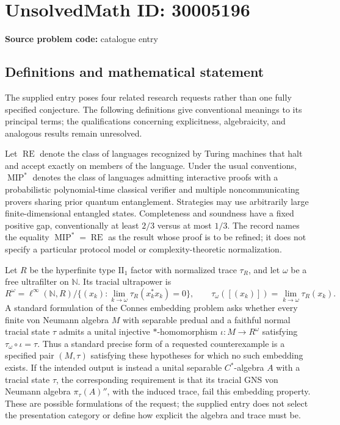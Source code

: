 \documentclass[11pt]{article}
\newcommand{\N}{\mathbb{N}}
\begin{document}
\section*{UnsolvedMath ID: 30005196}
\textbf{Source problem code:} catalogue entry
\subsection{Definitions and mathematical statement}
The supplied entry poses four related research requests rather than one fully specified conjecture. The following definitions give conventional meanings to its principal terms; the qualifications concerning explicitness, algebraicity, and analogous results remain unresolved.

Let \(\operatorname{RE}\) denote the class of languages recognized by Turing machines that halt and accept exactly on members of the language. Under the usual conventions, \(\operatorname{MIP}^{*}\) denotes the class of languages admitting interactive proofs with a probabilistic polynomial-time classical verifier and multiple noncommunicating provers sharing prior quantum entanglement. Strategies may use arbitrarily large finite-dimensional entangled states. Completeness and soundness have a fixed positive gap, conventionally at least \(2/3\) versus at most \(1/3\). The record names the equality \(\operatorname{MIP}^{*}=\operatorname{RE}\) as the result whose proof is to be refined; it does not specify a particular protocol model or complexity-theoretic normalization.

Let \(R\) be the hyperfinite type \(\mathrm{II}_1\) factor with normalized trace \(\tau_R\), and let \(\omega\) be a free ultrafilter on \(\N\). Its tracial ultrapower is
\[
 R^{\omega}=\ell^{\infty}(\N,R)\big/\{(x_k):\lim_{k\to\omega}\tau_R(x_k^*x_k)=0\},
 \qquad
 \tau_{\omega}([(x_k)])=\lim_{k\to\omega}\tau_R(x_k).
\]
A standard formulation of the Connes embedding problem asks whether every finite von Neumann algebra \(M\) with separable predual and a faithful normal tracial state \(\tau\) admits a unital injective \(*\)-homomorphism \(\iota:M\to R^{\omega}\) satisfying \(\tau_{\omega}\circ\iota=\tau\). Thus a standard precise form of a requested counterexample is a specified pair \((M,\tau)\) satisfying these hypotheses for which no such embedding exists. If the intended output is instead a unital separable \(C^*\)-algebra \(A\) with a tracial state \(\tau\), the corresponding requirement is that its tracial GNS von Neumann algebra \(\pi_{\tau}(A)''\), with the induced trace, fail this embedding property. These are possible formulations of the request; the supplied entry does not select the presentation category or define how explicit the algebra and trace must be.
\end{document}
